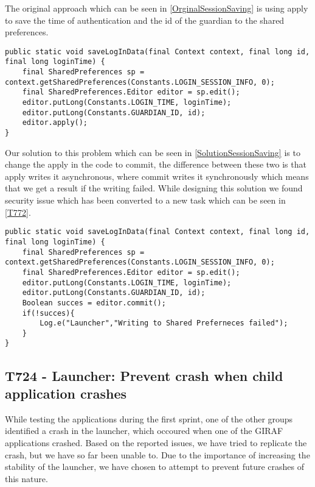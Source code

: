 The original approach which can be seen in \autoref{OrginalSessionSaving} is
using apply to save the time of authentication and the id of the guardian to
the shared preferences.\nl

\begin{minipage}[H]{\linewidth}
\begin{lstlisting}[caption = Original approach to saving login session, label =
OrginalSessionSaving]
public static void saveLogInData(final Context context, final long id, final long loginTime) {
    final SharedPreferences sp = context.getSharedPreferences(Constants.LOGIN_SESSION_INFO, 0);
    final SharedPreferences.Editor editor = sp.edit();
    editor.putLong(Constants.LOGIN_TIME, loginTime);
    editor.putLong(Constants.GUARDIAN_ID, id);
    editor.apply();
}
\end{lstlisting} 
\end{minipage}

Our solution to this problem which can be seen in
\autoref{SolutionSessionSaving} is to change the apply in the code to commit,
the difference between these two is that apply writes it asynchronous, where
commit writes it synchronously which means that we get a result if the writing
failed. While designing this solution we found security issue which has been
converted to a new task which can be seen in \autoref{T772}.\nl

\begin{minipage}[H]{\linewidth}
\begin{lstlisting}[caption = Our solution to saving login session, label
=SolutionSessionSaving ]
public static void saveLogInData(final Context context, final long id, final long loginTime) {
    final SharedPreferences sp = context.getSharedPreferences(Constants.LOGIN_SESSION_INFO, 0);
    final SharedPreferences.Editor editor = sp.edit();
    editor.putLong(Constants.LOGIN_TIME, loginTime);
    editor.putLong(Constants.GUARDIAN_ID, id);
    Boolean succes = editor.commit();
    if(!succes){
    	Log.e("Launcher","Writing to Shared Preferneces failed");
	}
} 
\end{lstlisting} 
\end{minipage}

\subsection{T724 - Launcher: Prevent crash when child application crashes}
While testing the applications during the first sprint, one of the other groups
identified a crash in the launcher, which occoured when one of the GIRAF
applications crashed. Based on the reported issues, we have tried to
replicate the crash, but we have so far been unable to. Due to the importance of
increasing the stability of the launcher, we have chosen to attempt to prevent
future crashes of this nature.\nl


